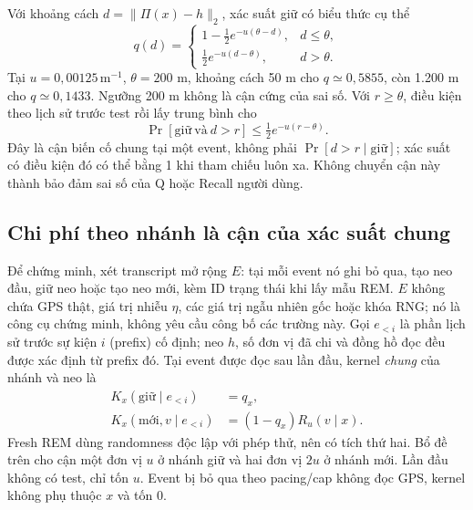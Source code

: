 Với khoảng cách $d=\|\Pi(x)-h\|_2$, xác suất giữ có biểu thức cụ thể
\begin{equation}
 q(d)=\begin{cases}
 1-\tfrac12 e^{-u(\theta-d)},&d\leq\theta,\\
 \tfrac12 e^{-u(d-\theta)},&d>\theta.
 \end{cases}
 \label{eq:formal-hold-probability}
\end{equation}
Tại $u=0{,}00125\,\mathrm m^{-1}$, $\theta=200$ m, khoảng cách 50 m cho
$q\simeq0{,}5855$, còn 1.200 m cho $q\simeq0{,}1433$. Ngưỡng 200 m
không là cận cứng của sai số. Với $r\geq\theta$, điều kiện theo lịch sử trước
test rồi lấy trung bình cho
\begin{equation}
 \Pr[\text{giữ}\ \text{và}\ d>r]
 \leq\tfrac12e^{-u(r-\theta)}.
 \label{eq:formal-far-hold-joint}
\end{equation}
Đây là cận biến cố chung tại một event, không phải
$\Pr[d>r\mid\text{giữ}]$; xác suất có điều kiện đó có thể bằng 1 khi
tham chiếu luôn xa. Không chuyển cận này thành bảo đảm sai số của Q hoặc
Recall người dùng.

\subsection{Chi phí theo nhánh là cận của xác suất chung}
\label{sec:formal-joint-branch}

Để chứng minh, xét transcript mở rộng $E$: tại mỗi event nó ghi bỏ qua,
tạo neo đầu, giữ neo hoặc tạo neo mới, kèm ID trạng thái khi lấy mẫu REM.
$E$ không chứa GPS thật, giá trị nhiễu $\eta$, các giá trị ngẫu nhiên gốc hoặc khóa RNG;
nó là công cụ chứng minh, không yêu cầu công bố các trường này. Gọi
$e_{<i}$ là phần lịch sử trước sự kiện $i$ (prefix) cố định; neo $h$, số đơn vị đã chi và đồng hồ đọc
đều được xác định từ prefix đó. Tại event được đọc sau lần đầu, kernel
\emph{chung} của nhánh và neo là
\begin{equation}
 \begin{split}
 K_x(\text{giữ}\mid e_{<i})&=q_x,\\
 K_x(\text{mới},v\mid e_{<i})&=(1-q_x)R_u(v\mid x).
 \end{split}
 \label{eq:formal-extended-step}
\end{equation}
Fresh REM dùng randomness độc lập với phép thử, nên có tích thứ hai.
Bổ đề trên cho cận một đơn vị $u$ ở nhánh giữ và hai đơn vị $2u$ ở nhánh
mới. Lần đầu không có test, chỉ tốn $u$. Event bị bỏ qua theo pacing/cap
không đọc GPS, kernel không phụ thuộc $x$ và tốn 0.

